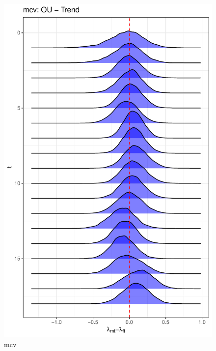 \documentclass[
  12pt,
]{article}
\begin{document}
\begin{figure}

{\centering \includegraphics[width=0.9\linewidth]{../Figures/mcv/lambda_diff} 

}

\caption{mcv}\label{fig:unnamed-chunk-15}
\end{figure}
\end{document}
